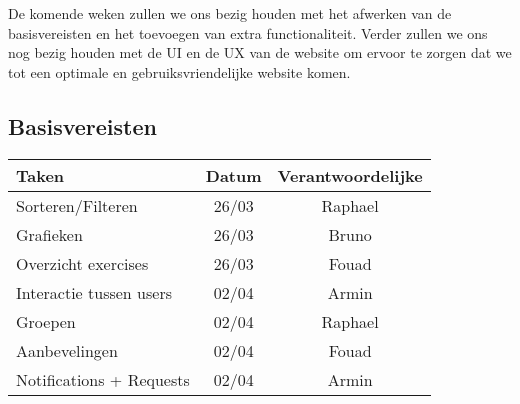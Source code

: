 De komende weken zullen we ons bezig houden met het afwerken van de basisvereisten en het toevoegen van extra functionaliteit. Verder zullen we ons nog bezig houden met de UI en de UX van de website om ervoor te zorgen dat we tot een optimale en gebruiksvriendelijke website komen.


\subsection{Basisvereisten}
\begin{tabular}{| l | c | c |}
    \hline
    Taken   &   Datum   &   Verantwoordelijke \\
    \hline \hline
    Sorteren/Filteren    &   26/03   &   Raphael \\
    Grafieken   &   26/03   &   Bruno   \\
    Overzicht exercises &   26/03   &   Fouad   \\
    Interactie tussen users  &   02/04   &   Armin \\
    Groepen  &   02/04   &   Raphael \\
    Aanbevelingen   &   02/04   &   Fouad   \\
    Notifications + Requests  &   02/04   &   Armin   \\
    \hline
\end{tabular}

